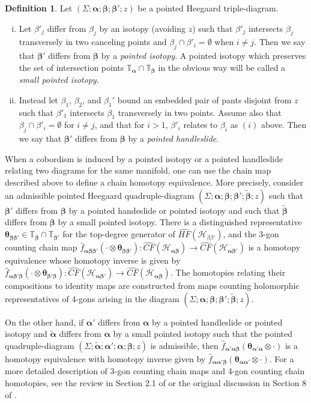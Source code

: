 \documentclass[11pt]{article}
\theoremstyle{plain} \newtheorem{thm}{Theorem}[subsection]
\theoremstyle{plain} \newtheorem{cor}[thm]{Corollary}
\theoremstyle{plain} \newtheorem{prop}[thm]{Proposition}
\theoremstyle{plain} \newtheorem{conj}[thm]{Conjecture}
\theoremstyle{plain} \newtheorem{lem}[thm]{Lemma}
\theoremstyle{definition} \newtheorem{df}[thm]{Definition}
\theoremstyle{remark} \newtheorem{rmk}[thm]{Remark}
\theoremstyle{remark} \newtheorem{obs}[thm]{Observation}
\newcommand{\h}{\mathcal{H}}
\newcommand{\tld}[1]{\widetilde{#1}}
\newcommand{\ba}{\boldsymbol{\alpha}}
\newcommand{\bb}{\boldsymbol{\beta}}
\newcommand{\bat}{\boldsymbol{\tld{\alpha}}}
\newcommand{\bbt}{\boldsymbol{\tld{\beta}}}
\newcommand{\Tb}{\mathbb{T}_{\bb}}
\newcommand{\thetabb}{\boldsymbol{\theta}_{\bb \bb'}}
\newcommand{\thet}[1]{\boldsymbol{\theta}_{#1}}
\newcommand{\tor}[1]{\mathbb{T}_{#1}}
\numberwithin{equation}{section}
\begin{document}
\begin{df}\label{def:moves}
Let $\left(\Sigma; \ba; \bb; \bb'; z\right)$ be a pointed Heegaard triple-diagram.
\begin{enumerate}[(i)]
\item Let $\beta'_j$ differ from $\beta_j$ by an isotopy (avoiding $z$) such that $\beta'_j$ intersects $\beta_j$ transversely in two canceling points and $\beta_j \cap \beta'_i = \emptyset$ when $i \neq j.$  Then we say that $\bb'$ differs from $\bb$ by a \textit{pointed isotopy}.  A pointed isotopy which preserves the set of intersection points $\tor{\ba}\cap\tor{\bb}$ in the obvious way will be called a \textit{small pointed isotopy}.
\item Instead let $\beta_{1}$, $\beta_{2}$, and $\beta_{1}'$ bound an embedded pair of pants disjoint from $z$ such that $\beta'_{1}$ intersects $\beta_{1}$ transversely in two points.  Assume also that $\beta_j \cap \beta'_i = \emptyset$ for $i \neq j$, and that for $i > 1$, $\beta'_{i}$ relates to $\beta_i$ as $(i)$ above.  Then we say that $\bb'$ differs from $\bb$ by a \textit{pointed handleslide}.
\end{enumerate}
\end{df}

When a cobordism is induced by a pointed isotopy or a pointed handleslide relating two diagrams for the same manifold, one can use the chain map described above to define a chain homotopy equivalence.  More precisely, consider an admissible pointed Heegaard quadruple-diagram $\left( \Sigma; \ba; \bb; \bb'; \bbt; z \right)$ such that $\bb'$ differs from $\bb$ by a pointed handeslide or pointed isotopy and such that $\bbt$ differs from $\bb$ by a small pointed isotopy.  There is a distinguished representative $\thet{\bb\bb'} \in \Tb \cap \tor{\bb'}$ for the top-degree generator of $\widehat{HF}(\h_{\beta\beta'})$, and the 3-gon counting chain map $\widehat{f}_{\ba\bb\bb'}(\cdot \otimes \thetabb):\widehat{CF}(\h_{\ba\bb}) \rightarrow \widehat{CF}(\h_{\ba\bb'})$ is a homotopy equivalence whose homotopy inverse is given by $\widehat{f}_{\ba\bb'\bb}(\cdot \otimes \thet{\bb'\bb}):\widehat{CF}(\h_{\ba\bb'}) \rightarrow \widehat{CF}(\h_{\ba\bb})$.  The homotopies relating their compositions to identity maps are constructed from maps counting holomorphic representatives of 4-gons arising in the diagram $\left( \Sigma; \ba; \bb; \bb'; \bbt; z \right)$.

On the other hand, if $\ba'$ differs from $\ba$ by a pointed handleslide or pointed isotopy and $\bat$ differs from $\ba$ by a small pointed isotopy such that the pointed quadruple-diagram $\left( \Sigma; \bat; \ba';\ba; \bb; z \right)$ is admissible, then $\widehat{f}_{\ba'\ba\bb}(\thet{\ba'\ba} \otimes \cdot )$ is a homotopy equivalence with homotopy inverse given by $\widehat{f}_{\ba\ba'\bb}(\thet{ \ba\ba' } \otimes \cdot)$.  For a more detailed description of 3-gon counting chain maps and 4-gon counting chain homotopies, see the review in Section 2.1 of \cite{et:R} or the original discussion in Section 8 of \cite{os:disk}.
\end{document}
